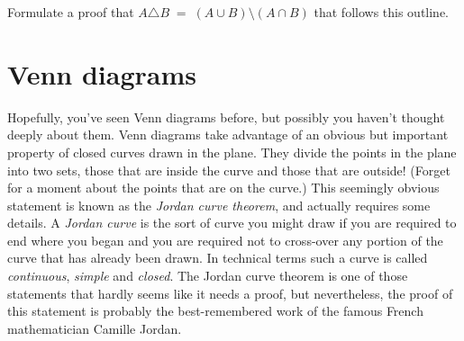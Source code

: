 \documentclass[10pt,]{book}
\theoremstyle{plain}
\theoremstyle{definition}
\theoremstyle{definition}
\numberwithin{equation}{section}
\newcommand{\hint}[1]{ }
\begin{document}
\begin{enumerate}[label=(\alph*)]
      Formulate a proof that \(A \triangle B \; = \; (A \cup B) \setminus (A \cap B)\) that follows this outline.

      \hint{The definition of \(A \triangle B\) is \((A\setminus B) \cup (B\setminus A)\).  The definition of 
      \(X \setminus Y\) is \(X \cap \overline{Y}\).   Restating things in terms of \(\cap\) and \(\cup\) (and complementation) should help.  So your first few lines should be:
      \begin{quote}
      Suppose \(x \in  A \triangle B\).  
 
      Then, by definition, \(x \in (A\setminus B) \cup (B\setminus A)\).
 
       So, \(x \in (A \cap \overline{B}) \cup (B \cap \overline{A})\).
   
      \(\vdots\)\end{quote}

      }
\end{enumerate}
\typeout{************************************************}
\typeout{************************************************}
\section[{Venn diagrams}]{Venn diagrams}\label{section-24}

    Hopefully, you've seen
    Venn diagrams before, but possibly
    you haven't thought deeply about them. Venn diagrams take
    advantage of an obvious but important property of closed
    curves drawn in the plane. They divide the points in the
    plane into two sets, those that are inside the curve and
    those that are outside! (Forget for a moment about the points
    that are on the curve.) This seemingly obvious statement
    is known as the
    \emph{Jordan curve theorem}, and actually
    requires some details. A
    \emph{Jordan curve} is the sort
    of curve you might draw if you are required to end where
    you began and you are required not to cross-over any portion
    of the curve that has already been drawn. In technical
    terms such a curve is called \emph{continuous}, \emph{simple}
    and \emph{closed}.
    The Jordan curve theorem is one of those statements that hardly
    seems like it needs a proof, but nevertheless, the proof of this
    statement is probably the best-remembered work of the famous
    French mathematician Camille Jordan.
\par
\end{document}

